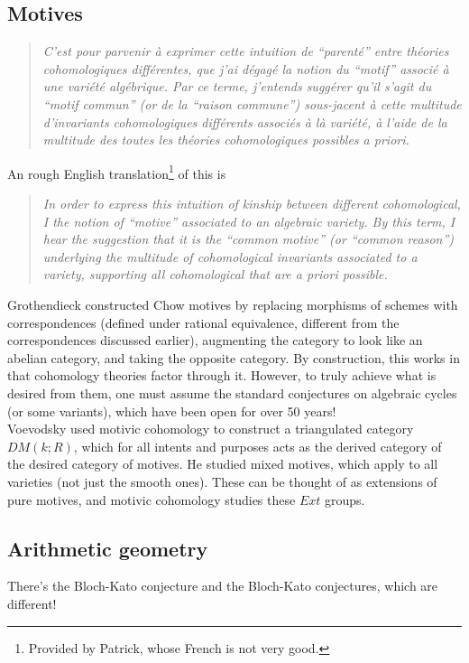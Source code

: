 \documentclass[leqno, openany]{memoir}
\theoremstyle{definition}
\theoremstyle{remark}
\theoremstyle{plain}
\theoremstyle{definition}
\theoremstyle{remark}
\begin{document}
\subsection{Motives} 
\begin{quotation}
    \textit{C'est pour parvenir \`a exprimer cette intuition de ``parent\'e'' entre th\'eories cohomologiques diff\'erentes, que j'ai d\'egag\'e la notion du ``motif'' associ\'e \`a une vari\'et\'e alg\'ebrique. Par ce terme, j'entends sugg\'erer qu'il s'agit du ``motif commun'' (or de la ``raison commune'') sous-jacent \`a cette multitude d'invariants cohomologiques diff\'erents associ\'es \`a l\`a vari\'et\'e, \`a l'aide de la multitude des toutes les th\'eories cohomologiques possibles a priori.} 
\end{quotation}
An rough English translation\footnote{Provided by Patrick, whose French is not very good.} of this is
\begin{quotation}
    \textit{In order to express this intuition of kinship between different cohomological, I the notion of ``motive'' associated to an algebraic variety. By this term, I hear the suggestion that it is the ``common motive'' (or ``common reason'') underlying the multitude of cohomological invariants associated to a variety, supporting all cohomological that are a priori possible.} 
\end{quotation}

Grothendieck constructed Chow motives by replacing morphisms of schemes with correspondences (defined under rational equivalence, different from the correspondences discussed earlier), augmenting the category to look like an abelian category, and taking the opposite category.  By construction, this works in that cohomology theories factor through it.  However, to truly achieve what is desired from them, one must assume the standard conjectures on algebraic cycles (or some variants), which have been open for over 50 years! \\ 

Voevodsky used motivic cohomology to construct a triangulated category $DM(k; R)$, which for all intents and purposes acts as the derived category of the desired category of motives.  He studied mixed motives, which apply to all varieties (not just the smooth ones).  These can be thought of as extensions of pure motives, and motivic cohomology studies these $Ext$ groups.  

\subsection{Arithmetic geometry} 
There's the Bloch-Kato conjecture and the Bloch-Kato conjectures, which are different! \\ 
\end{document}
